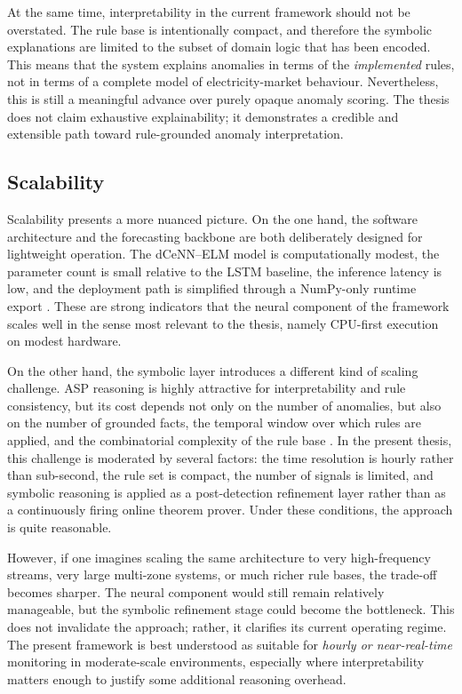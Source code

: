 At the same time, interpretability in the current framework should not be overstated. The rule base is intentionally compact, and therefore the symbolic explanations are limited to the subset of domain logic that has been encoded. This means that the system explains anomalies in terms of the \emph{implemented} rules, not in terms of a complete model of electricity-market behaviour. Nevertheless, this is still a meaningful advance over purely opaque anomaly scoring. The thesis does not claim exhaustive explainability; it demonstrates a credible and extensible path toward rule-grounded anomaly interpretation.

\subsection{Scalability}
\label{subsec:discussion_scalability}

Scalability presents a more nuanced picture. On the one hand, the software architecture and the forecasting backbone are both deliberately designed for lightweight operation. The dCeNN--ELM model is computationally modest, the parameter count is small relative to the LSTM baseline, the inference latency is low, and the deployment path is simplified through a NumPy-only runtime export \cite{repo_thesis_grid_anomaly}. These are strong indicators that the neural component of the framework scales well in the sense most relevant to the thesis, namely CPU-first execution on modest hardware.

On the other hand, the symbolic layer introduces a different kind of scaling challenge. ASP reasoning is highly attractive for interpretability and rule consistency, but its cost depends not only on the number of anomalies, but also on the number of grounded facts, the temporal window over which rules are applied, and the combinatorial complexity of the rule base \cite{gebser2012answer,gebser2019multi}. In the present thesis, this challenge is moderated by several factors: the time resolution is hourly rather than sub-second, the rule set is compact, the number of signals is limited, and symbolic reasoning is applied as a post-detection refinement layer rather than as a continuously firing online theorem prover. Under these conditions, the approach is quite reasonable.

However, if one imagines scaling the same architecture to very high-frequency streams, very large multi-zone systems, or much richer rule bases, the trade-off becomes sharper. The neural component would still remain relatively manageable, but the symbolic refinement stage could become the bottleneck. This does not invalidate the approach; rather, it clarifies its current operating regime. The present framework is best understood as suitable for \emph{hourly or near-real-time} monitoring in moderate-scale environments, especially where interpretability matters enough to justify some additional reasoning overhead.

